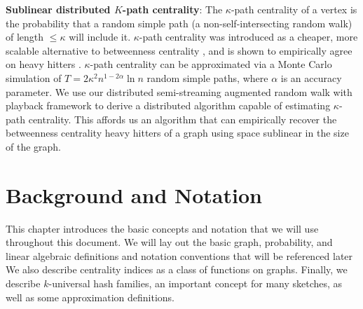 \documentclass[10]{report}
\begin{document}
\noindent
\textbf{Sublinear distributed $K$-path centrality}:
The $\kappa$-path centrality of a vertex is the probability that a random simple path (a non-self-intersecting random walk) of length $\leq \kappa$ will include it.
$\kappa$-path centrality was introduced as a cheaper, more scalable alternative to betweenness centrality \cite{alahakoon2011k}, and is shown to empirically agree on heavy hitters \cite{kourtellis2013identifying}.
$\kappa$-path centrality can be approximated via a Monte Carlo simulation of $T = 2 \kappa^2 n^{1-2\alpha} \ln n$ random simple paths, where $\alpha$ is an accuracy parameter. 
We use our distributed semi-streaming augmented random walk with playback framework to derive a distributed algorithm capable of estimating $\kappa$-path centrality.
This affords us an algorithm that can empirically recover the betweenness centrality heavy hitters of a graph using space sublinear in the size of the graph.  





\chapter{Background and Notation} \label{chap:background}

This chapter introduces the basic concepts and notation that we will use throughout this document.
We will lay out the basic graph, probability, and linear algebraic definitions and notation conventions that will be referenced later
We also describe centrality indices as a class of functions on graphs.
Finally, we describe $k$-universal hash families, an important concept for many sketches, as well as some approximation definitions.



\end{document}
